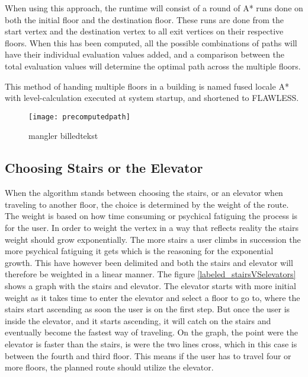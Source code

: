 When using this approach, the runtime will consist of a round of A* runs done on both the initial floor and the destination floor. These runs are done from the start vertex and the destination vertex to all exit vertices on their respective floors. When this has been computed, all the possible combinations of paths will have their individual evaluation values added, and a comparison between the total evaluation values will determine the optimal path across the multiple floors. 

This method of handing multiple floors in a building is named fused locale A* with level-calculation executed at system startup, and shortened to FLAWLESS. 


\begin{figure}[ht!]
    \centering
    \texttt{[image: precomputedpath]}
    \caption{mangler billedtekst}
    \label{fig:precomp}
  \end{figure}


\subsection{Choosing Stairs or the Elevator}

When the algorithm stands between choosing the stairs, or an elevator when traveling to another floor, the choice is determined by the weight of the route. The weight is based on how time consuming or psychical fatiguing the process is for the user. In order to weight the vertex in a way that reflects reality the stairs weight should grow exponentially. The more stairs a user climbs in succession the more psychical fatiguing it gets which is the reasoning for the exponential growth. This have however been delimited 
 and both the stairs and elevator will therefore be weighted in a linear manner. The figure \cref{labeled_stairsVSelevators} shows a graph with the stairs and elevator. The elevator starts with more initial weight as it takes time to enter the elevator and select a floor to go to, where the stairs start ascending as soon the user is on the first step. But once the user is inside the elevator, and it starts ascending, it will catch on the stairs and eventually become the fastest way of traveling. On the graph, the point were the elevator is faster than the stairs, is were the two lines cross, which in this case is between the fourth and third floor. This means if the user has to travel four or more floors, the planned route should utilize the elevator.

